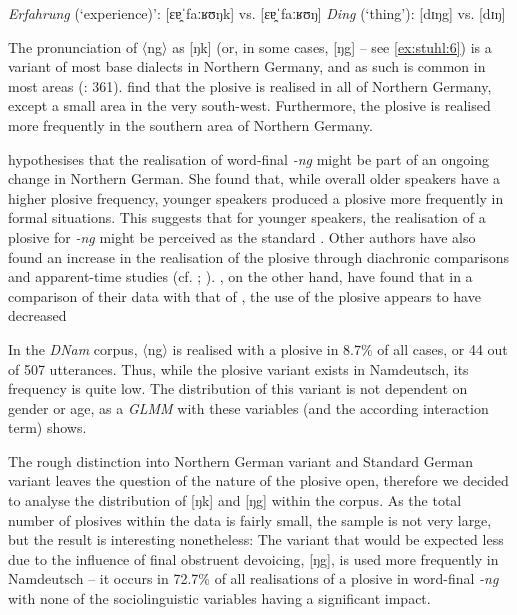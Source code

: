 \documentclass[output=paper]{langsci/langscibook}
\begin{document}
 
\ea\label{ex:stuhl:5}  
\textit{Erfahrung} (‘experience)’: {[ɛɐ̯ˈfaːʁʊŋk]} vs. {[ɛɐ̯ˈfaːʁʊŋ]}
 \ex\label{ex:stuhl:6}    
\textit{Ding} (‘thing’): {[dɪŋg]} vs. {[dɪŋ]}
 \z
 

The pronunciation of 〈ng〉 as [ŋk] (or, in some cases, [ŋg] -- see \ref{ex:stuhl:6}) is a variant of most base dialects in Northern Germany, and as such is common in most areas (\citealt{elmentaler_norddeutscher_2015}: 361). \citet[359]{elmentaler_norddeutscher_2015} find that the plosive is realised in all of Northern Germany, except a small area in the very south-west. Furthermore, the plosive is realised more frequently in the southern area of Northern Germany.

\citet[83]{becker_ruhrdeutsch_2003} hypothesises that the realisation of word-final \textit{-ng} might be part of an ongoing change in Northern German. She found that, while overall older speakers have a higher plosive frequency, younger speakers produced a plosive more frequently in formal situations. This suggests that for younger speakers, the realisation of a plosive for \textit{-ng} might be perceived as the standard \citep[83]{becker_ruhrdeutsch_2003}. Other authors have also found an increase in the realisation of the plosive through diachronic comparisons and apparent-time studies (cf. \citealt{stellmacher_studien_1977}; \citealt{lameli_standard_2004}). \citet[362]{elmentaler_norddeutscher_2015}, on the other hand, have found that in a comparison of their data with that of \citet{pfeffer_grunddeutsch_1975}, the use of the plosive appears to have decreased

In the \textit{DNam} corpus, 〈ng〉 is realised with a plosive in 8.7\% of all cases, or 44 out of 507 utterances. Thus, while the plosive variant exists in Namdeutsch, its frequency is quite low. The distribution of this variant is not dependent on gender or age, as a \textit{GLMM} with these variables (and the according interaction term) shows. 

The rough distinction into Northern German variant and Standard German variant leaves the question of the nature of the plosive open, therefore we decided to analyse the distribution of [ŋk] and [ŋg] within the corpus. As the total number of plosives within the data is fairly small, the sample is not very large, but the result is interesting nonetheless: The variant that would be expected less due to the influence of final obstruent devoicing, [ŋg], is used more frequently in Namdeutsch – it occurs in 72.7\% of all realisations of a plosive in word-final \textit{-ng} with none of the sociolinguistic variables having a significant impact.
\end{document}
